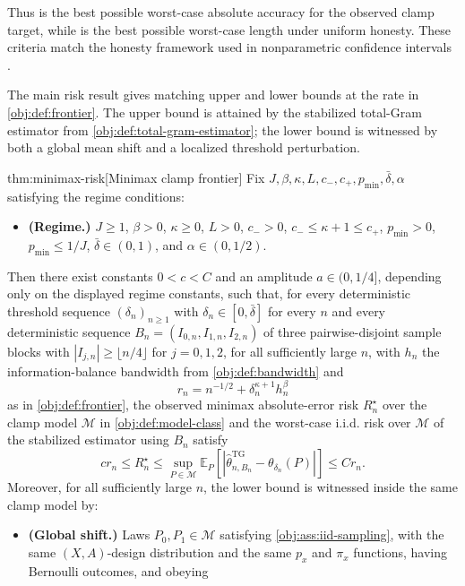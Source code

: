 Thus  is the best possible worst-case absolute accuracy for the observed clamp target, while  is the best possible worst-case length under uniform honesty. These criteria match the honesty framework used in nonparametric confidence intervals \citep{Low1997NonparametricConfidenceIntervals,ArmstrongKolesar2018OptimalInference}.

The main risk result gives matching upper and lower bounds at the rate in \cref{obj:def:frontier}. The upper bound is attained by the stabilized total-Gram estimator from \cref{obj:def:total-gram-estimator}; the lower bound is witnessed by both a global mean shift and a localized threshold perturbation.

\begin{theoremv}{thm:minimax-risk}[Minimax clamp frontier]
Fix \(J,\beta,\kappa,L,c_-,c_+,p_{\min},\bar\delta,\alpha\) satisfying the regime conditions:
\begin{itemize}
\item \textbf{(Regime.)} \(J\geq 1\), \(\beta>0\), \(\kappa\geq0\), \(L>0\), \(c_->0\), \(c_-\leq \kappa+1\leq c_+\), \(p_{\min}>0\), \(p_{\min}\leq 1/J\), \(\bar\delta\in(0,1)\), and \(\alpha\in(0,1/2)\).
\end{itemize}
Then there exist constants \(0<c<C\) and an amplitude \(a\in(0,1/4]\), depending only on the displayed regime constants, such that, for every deterministic threshold sequence \((\delta_n)_{n\geq1}\) with \(\delta_n\in[0,\bar\delta]\) for every \(n\) and every deterministic sequence \(B_n=(I_{0,n},I_{1,n},I_{2,n})\) of three pairwise-disjoint sample blocks with \(|I_{j,n}|\geq \lfloor n/4\rfloor\) for \(j=0,1,2\), for all sufficiently large \(n\), with \(h_n\) the information-balance bandwidth from \cref{obj:def:bandwidth} and
\[
r_n=n^{-1/2}+\delta_n^{\kappa+1}h_n^\beta
\]
as in \cref{obj:def:frontier}, the observed minimax absolute-error risk \(R_n^\star\) over the clamp model \(\mathcal M\) in \cref{obj:def:model-class} and the worst-case i.i.d. risk over \(\mathcal M\) of the stabilized estimator using \(B_n\) satisfy
\[
c r_n
\leq
R_n^\star
\leq
\sup_{P\in\mathcal M} \mathbb E_P\!\left[
\left|\widehat\theta_{n,B_n}^{\mathrm{TG}}-\theta_{\delta_n}(P)\right|
\right]
\leq
C r_n .
\]
Moreover, for all sufficiently large \(n\), the lower bound is witnessed inside the same clamp model by:
\begin{itemize}
\item \textbf{(Global shift.)} Laws \(P_0,P_1\in\mathcal M\) satisfying \cref{obj:ass:iid-sampling}, with the same \((X,A)\)-design distribution and the same \(p_x\) and \(\pi_x\) functions, having Bernoulli outcomes, and obeying

\end{itemize}
\end{theoremv}
